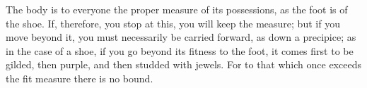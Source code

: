 The body is to  everyone the proper measure of its possessions,  as the foot is
of the shoe. If, therefore, you stop at this, you will keep the measure; but if
you  move  beyond it,  you  must  necessarily be  carried  forward,  as down  a
precipice; as in the case of a shoe,  if you go beyond its fitness to the foot,
it comes first to be gilded, then  purple, and then studded with jewels. For to
that which once exceeds the fit measure there is no bound.
